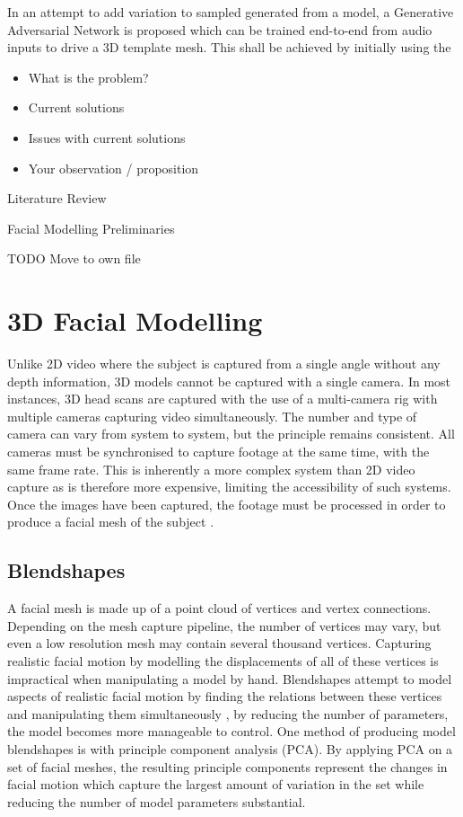 \documentclass[12pt]{report}
\begin{document}
In an attempt to add variation to sampled generated from a model, a Generative Adversarial Network is proposed which can be trained end-to-end from audio inputs to drive a 3D template mesh.
This shall be achieved by initially using the 

\begin{itemize}

    \item What is the problem?
    \item Current solutions
    \item Issues with current solutions
    \item Your observation / proposition

\end{itemize}

\newpage
Literature Review

%

\newpage
Facial Modelling Preliminaries

TODO
Move to own file

\section{3D Facial Modelling}
Unlike 2D video where the subject is captured from a single angle without any depth information, 3D models cannot be captured with a single camera.
In most instances, 3D head scans are captured with the use of a multi-camera rig with multiple cameras capturing video simultaneously.
The number and type of camera can vary from system to system, but the principle remains consistent.
All cameras must be synchronised to capture footage at the same time, with the same frame rate.
This is inherently a more complex system than 2D video capture as is therefore more expensive, limiting the accessibility of such systems.  
Once the images have been captured, the footage must be processed in order to produce a facial mesh of the subject \cite{Li2017}.

\subsection{Blendshapes}
A facial mesh is made up of a point cloud of vertices and vertex connections.
Depending on the mesh capture pipeline, the number of vertices may vary, but even a low resolution mesh may contain several thousand vertices.
Capturing realistic facial motion by modelling the displacements of all of these vertices is impractical when manipulating a model by hand.
Blendshapes attempt to model aspects of realistic facial motion by finding the relations between these vertices and manipulating them simultaneously \cite{Lewis2010}, by reducing the number of parameters, the model becomes more manageable to control.
One method of producing model blendshapes is with principle component analysis (PCA).
By applying PCA on a set of facial meshes, the resulting principle components represent the changes in facial motion which capture the largest amount of variation in the set while reducing the number of model parameters substantial.
%
%
\end{document}
